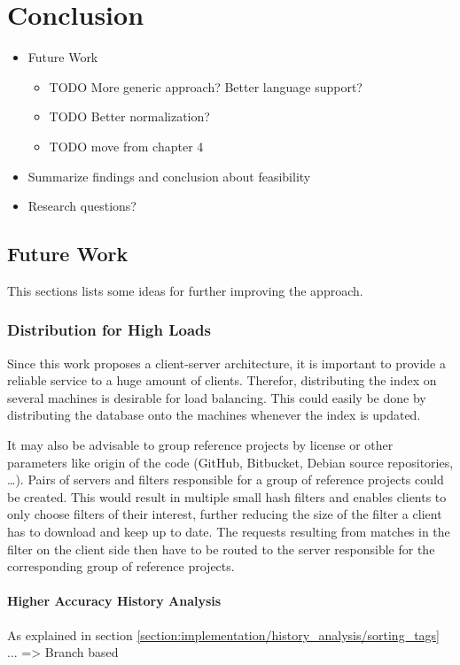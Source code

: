 
\chapter{Conclusion}\label{chapter:conclusion}
\begin{itemize}
	\item Future Work
	\begin{itemize}
	    \item TODO More generic approach? Better language support?
	    \item TODO Better normalization?
	    \item TODO move from chapter 4
	\end{itemize}
	\item Summarize findings and conclusion about feasibility
	\item Research questions?
\end{itemize}

\section{Future Work}
This sections lists some ideas for further improving the approach.

\subsection{Distribution for High Loads}
Since this work proposes a client-server architecture, it is important to provide a reliable service to a huge amount of clients.
Therefor, distributing the index on several machines is desirable for load balancing.
This could easily be done by distributing the database onto the machines whenever the index is updated.

It may also be advisable to group reference projects by license or other parameters like origin of the code (GitHub, Bitbucket, Debian source repositories, \dots).
Pairs of servers and filters responsible for a group of reference projects could be created.
This would result in multiple small hash filters and enables clients to only choose filters of their interest, further reducing the size of the filter a client has to download and keep up to date.
The requests resulting from matches in the filter on the client side then have to be routed to the server responsible for the corresponding group of reference projects.

\subsubsection{Higher Accuracy History Analysis}
As explained in section \ref{section:implementation/history_analysis/sorting_tags} ... => Branch based

